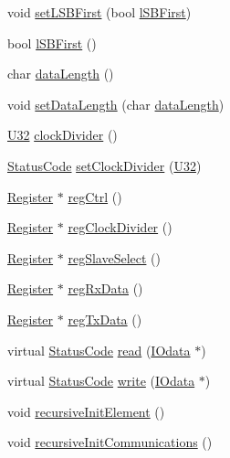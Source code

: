 \begin{DoxyCompactItemize}
\item 
void \hyperlink{classUsbSpiBus_ab601d59e0b5110c2275c1cc298664e27}{set\+L\+S\+B\+First} (bool \hyperlink{classUsbSpiBus_af6af49c1ac52cc0586570c1f43d0bc25}{l\+S\+B\+First})
\item 
bool \hyperlink{classUsbSpiBus_af6af49c1ac52cc0586570c1f43d0bc25}{l\+S\+B\+First} ()
\item 
char \hyperlink{classUsbSpiBus_ae7d38b275b5267f795b2d9f1d561d688}{data\+Length} ()
\item 
void \hyperlink{classUsbSpiBus_abb9644f0110078dc08c84c907d11272e}{set\+Data\+Length} (char \hyperlink{classUsbSpiBus_ae7d38b275b5267f795b2d9f1d561d688}{data\+Length})
\item 
\hyperlink{classUsbSpiBus_a9b24e28662a35ca57f5ed32c41c5f3ff}{U32} \hyperlink{classUsbSpiBus_aa7a56b8aedb646ba46408cb5016dde1c}{clock\+Divider} ()
\item 
\hyperlink{classStatusCode}{Status\+Code} \hyperlink{classUsbSpiBus_a8cd3c808e7b72d8bc0f1d85a774e8c99}{set\+Clock\+Divider} (\hyperlink{classUsbSpiBus_a9b24e28662a35ca57f5ed32c41c5f3ff}{U32})
\item 
\hyperlink{classRegister}{Register} $\ast$ \hyperlink{classUsbSpiBus_a22900de7a32af6916f74584f2172424a}{reg\+Ctrl} ()
\item 
\hyperlink{classRegister}{Register} $\ast$ \hyperlink{classUsbSpiBus_a338edc7bdac1abd1998890bb1aa0509a}{reg\+Clock\+Divider} ()
\item 
\hyperlink{classRegister}{Register} $\ast$ \hyperlink{classUsbSpiBus_a9bc70ad9842d8aa8f89b24599bfd6238}{reg\+Slave\+Select} ()
\item 
\hyperlink{classRegister}{Register} $\ast$ \hyperlink{classUsbSpiBus_adb0c94f37c7e6008ed4540efa94559b3}{reg\+Rx\+Data} ()
\item 
\hyperlink{classRegister}{Register} $\ast$ \hyperlink{classUsbSpiBus_ab8044b2af7209f9eb37c0a96e3e28637}{reg\+Tx\+Data} ()
\item 
virtual \hyperlink{classStatusCode}{Status\+Code} \hyperlink{classUsbSpiBus_a6c08e2e9a50e4c540c1eda6d7d2967a5}{read} (\hyperlink{classIOdata}{I\+Odata} $\ast$)
\item 
virtual \hyperlink{classStatusCode}{Status\+Code} \hyperlink{classUsbSpiBus_a3ac9d6f5053ddb8b2f8336f2aa88934e}{write} (\hyperlink{classIOdata}{I\+Odata} $\ast$)
\item 
void \hyperlink{classElement_a3c0abcb36f8906688bb7e32608df7086}{recursive\+Init\+Element} ()
\item 
void \hyperlink{classElement_a82119ed37dff76508a2746a853ec35ba}{recursive\+Init\+Communications} ()

\end{DoxyCompactItemize}
